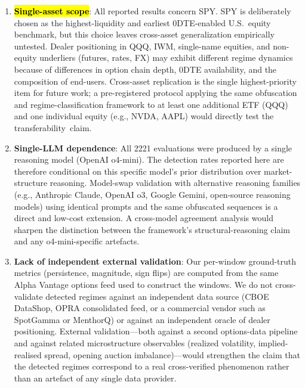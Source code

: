 \documentclass[jrfm,article,accept,moreauthors,pdftex]{Definitions/mdpi}
\begin{document}
\begin{enumerate}[leftmargin=*,labelsep=4.5mm]
\item \textbf{\hl{Single-asset scope}}: %
 All reported results concern SPY.
SPY is deliberately chosen as the highest-liquidity and earliest 0DTE-enabled
U.S.\ equity benchmark, but this choice leaves cross-asset generalization
empirically untested. Dealer positioning in QQQ, IWM, single-name equities,
and non-equity underliers (futures, rates, FX) may exhibit different
regime dynamics because of differences in option chain depth, 0DTE
availability, and the composition of end-users. Cross-asset replication is
the single highest-priority item for future work; a pre-registered protocol
applying the same obfuscation and regime-classification framework to at
least one additional ETF (QQQ) and one individual equity (e.g., NVDA, AAPL)
would directly test the \mbox{transferability claim.}

\item \textbf{Single-LLM dependence}: All 2221 evaluations were
produced by a single reasoning model (OpenAI o4-mini). The detection
rates reported here are therefore conditional on this specific model's
prior distribution over market-structure reasoning. Model-swap
validation with alternative reasoning families
(e.g., Anthropic Claude, OpenAI o3, Google Gemini, open-source
reasoning models) using identical prompts and the same obfuscated
sequences is a direct and low-cost extension. A cross-model agreement
analysis would sharpen the distinction between the framework's
structural-reasoning claim and any o4-mini-specific artefacts.

\item \textbf{Lack of independent external validation}: Our per-window
ground-truth metrics (persistence, magnitude, sign flips) are computed
from the same Alpha Vantage options feed used to construct the windows.
We do not cross-validate detected regimes against an independent
data source (CBOE DataShop, OPRA consolidated feed, or a commercial
vendor such as SpotGamma or MenthorQ) or against an independent oracle
of dealer positioning. External validation---both against a second
options-data pipeline and against related microstructure observables
(realized volatility, implied-realised spread, opening auction
imbalance)---would strengthen the claim that the detected regimes
correspond to a real cross-verified phenomenon rather than an artefact
of any single data provider.


\end{enumerate}
\end{document}
